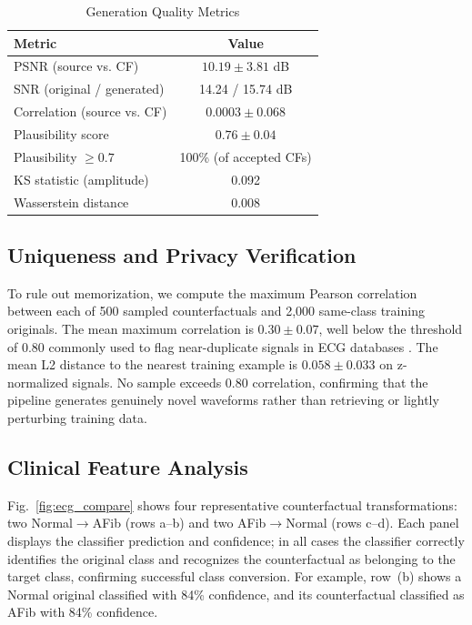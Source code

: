 \documentclass[conference]{IEEEtran}
\begin{document}
\begin{table}[t]
\centering
\caption{Generation Quality Metrics}
\label{tab:quality}
\begin{tabular}{lc}
\toprule
\textbf{Metric} & \textbf{Value} \\
\midrule
PSNR (source vs. CF)       & $10.19 \pm 3.81$ dB \\
SNR (original / generated)  & 14.24 / 15.74 dB \\
Correlation (source vs. CF) & $0.0003 \pm 0.068$ \\
Plausibility score           & $0.76 \pm 0.04$ \\
Plausibility $\geq 0.7$     & 100\% (of accepted CFs) \\
KS statistic (amplitude)    & 0.092 \\
Wasserstein distance         & 0.008 \\
\bottomrule
\end{tabular}
\end{table}

\subsection{Uniqueness and Privacy Verification}

To rule out memorization, we compute the maximum Pearson correlation between each of 500 sampled counterfactuals and 2,000 same-class training originals. The mean maximum correlation is $0.30 \pm 0.07$, well below the threshold of 0.80 commonly used to flag near-duplicate signals in ECG databases \cite{clifford2006}. The mean L2 distance to the nearest training example is $0.058 \pm 0.033$ on z-normalized signals. No sample exceeds 0.80 correlation, confirming that the pipeline generates genuinely novel waveforms rather than retrieving or lightly perturbing training data.

\subsection{Clinical Feature Analysis}

Fig.~\ref{fig:ecg_compare} shows four representative counterfactual transformations: two Normal$\rightarrow$AFib (rows a--b) and two AFib$\rightarrow$Normal (rows c--d). Each panel displays the classifier prediction and confidence; in all cases the classifier correctly identifies the original class and recognizes the counterfactual as belonging to the target class, confirming successful class conversion. For example, row~(b) shows a Normal original classified with 84\% confidence, and its counterfactual classified as AFib with 84\% confidence.
\end{document}
